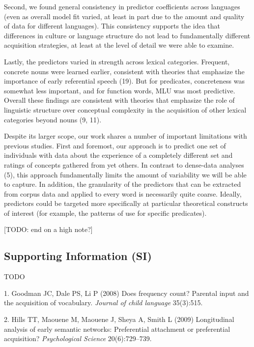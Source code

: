 \documentclass[9pt,twocolumn,twoside]{pnas-new}
\begin{document}
Second, we found general consistency in predictor coefficients across
languages (even as overall model fit varied, at least in part due to the
amount and quality of data for different languages). This consistency
supports the idea that differences in culture or language structure do
not lead to fundamentally different acquisition strategies, at least at
the level of detail we were able to examine.

Lastly, the predictors varied in strength across lexical categories.
Frequent, concrete nouns were learned earlier, consistent with theories
that emphasize the importance of early referential speech (19). But for
predicates, concreteness was somewhat less important, and for function
words, MLU was most predictive. Overall these findings are consistent
with theories that emphasize the role of linguistic structure over
conceptual complexity in the acquisition of other lexical categories
beyond nouns (9, 11).

Despite its larger scope, our work shares a number of important
limitations with previous studies. First and foremost, our approach is
to predict one set of individuals with data about the experience of a
completely different set and ratings of concepts gathered from yet
others. In contrast to dense-data analyses (5), this approach
fundamentally limits the amount of variability we will be able to
capture. In addition, the granularity of the predictors that can be
extracted from corpus data and applied to every word is necessarily
quite coarse. Ideally, predictors could be targeted more specifically at
particular theoretical constructs of interest (for example, the patterns
of use for specific predicates).

{[}TODO: end on a high note?{]}

\subsection*{Supporting Information
(SI)}\label{supporting-information-si}

TODO

\showmatmethods
\showacknow
\pnasbreak

\hypertarget{refs}{}
\hypertarget{ref-goodman2008}{}
1. Goodman JC, Dale PS, Li P (2008) Does frequency count? Parental input
and the acquisition of vocabulary. \emph{Journal of child language}
35(3):515.

\hypertarget{ref-hills2009}{}
2. Hills TT, Maouene M, Maouene J, Sheya A, Smith L (2009) Longitudinal
analysis of early semantic networks: Preferential attachment or
preferential acquisition? \emph{Psychological Science} 20(6):729--739.
\end{document}
